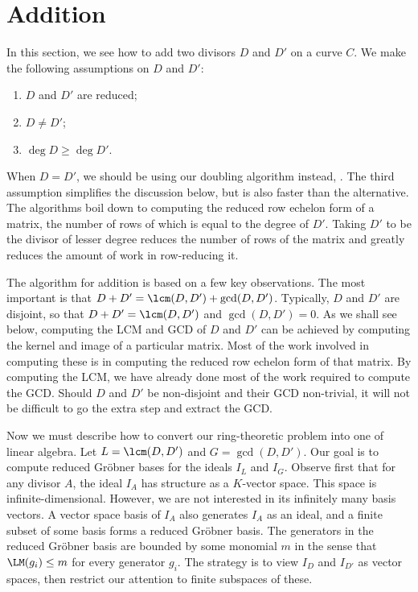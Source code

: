 
\section{Addition}

In this section, we see how to add two divisors $D$ and $D'$ on a curve $C$.
We make the following assumptions on $D$ and $D'$:
\begin{enumerate}[label=(\roman*)]
  \item $D$ and $D'$ are reduced;
  \item $D \neq D'$;
  \item $\deg D \geq \deg D'$.
\end{enumerate}
When $D = D'$, we should be using our doubling algorithm instead, .
The third assumption simplifies the discussion below, but is also faster than the alternative.
The algorithms boil down to computing the reduced row echelon form of a matrix, the number of rows of which is equal to the degree of $D'$.
Taking $D'$ to be the divisor of lesser degree reduces the number of rows of the matrix and greatly reduces the amount of work in row-reducing it.

The algorithm for addition is based on a few key observations.
The most important is that $D + D' = \lcm(D, D') + \gcd(D, D')$.
Typically, $D$ and $D'$ are disjoint, so that $D + D' = \lcm(D, D')$ and $\gcd(D, D') = 0$.
As we shall see below, computing the LCM and GCD of $D$ and $D'$ can be achieved by computing the kernel and image of a particular matrix.
Most of the work involved in computing these is in computing the reduced row echelon form of that matrix.
By computing the LCM, we have already done most of the work required to compute the GCD.
Should $D$ and $D'$ be non-disjoint and their GCD non-trivial, it will not be difficult to go the extra step and extract the GCD.

Now we must describe how to convert our ring-theoretic problem into one of linear algebra.
Let $L = \lcm(D, D')$ and $G = \gcd(D, D')$.
Our goal is to compute reduced Gr\"obner bases for the ideals $I_L$ and $I_G$.
Observe first that for any divisor $A$, the ideal $I_A$ has structure as a $K$-vector space.
This space is infinite-dimensional.
However, we are not interested in its infinitely many basis vectors.
A vector space basis of $I_A$ also generates $I_A$ as an ideal,
and a finite subset of some basis forms a reduced Gr\"obner basis.
The generators in the reduced Gr\"obner basis are bounded by some monomial $m$
in the sense that $\LM(g_i) \leq m$ for every generator $g_i$.
The strategy is to view $I_D$ and $I_{D'}$ as vector spaces,
then restrict our attention to finite subspaces of these.

